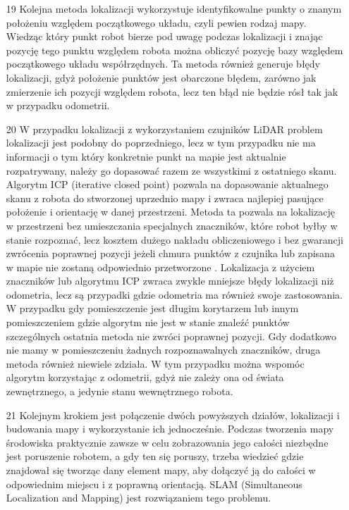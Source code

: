 \documentclass[10pt,a4paper]{article}
\begin{document}
\begin{itemize}
		\item[19]
		Kolejna metoda lokalizacji wykorzystuje identyfikowalne punkty o znanym położeniu względem początkowego układu, czyli pewien rodzaj mapy.
Wiedząc który punkt robot bierze pod uwagę podczas lokalizacji i znając pozycję tego punktu względem robota można obliczyć pozycję bazy względem początkowego układu współrzędnych.
Ta metoda również generuje błędy lokalizacji, gdyż położenie punktów jest obarczone błędem, zarówno jak zmierzenie ich pozycji względem robota, lecz ten błąd nie będzie rósł tak jak w przypadku odometrii.
		\item[20]
	W przypadku lokalizacji z wykorzystaniem czujników LiDAR problem lokalizacji jest podobny do poprzedniego, lecz w tym przypadku nie ma informacji o tym który konkretnie punkt na mapie jest aktualnie rozpatrywany, należy go dopasować razem ze wszystkimi z ostatniego skanu.
Algorytm ICP (iterative closed point) pozwala na dopasowanie aktualnego skanu z robota do stworzonej uprzednio mapy i zwraca najlepiej pasujące położenie i orientację w danej przestrzeni.
Metoda ta pozwala na lokalizację w przestrzeni bez umieszczania specjalnych znaczników, które robot byłby w stanie rozpoznać, lecz kosztem dużego nakładu obliczeniowego i bez gwarancji zwrócenia poprawnej pozycji jeżeli chmura punktów z czujnika lub zapisana w mapie nie zostaną odpowiednio przetworzone \cite{icp_article}.
Lokalizacja z użyciem znaczników lub algorytmu ICP zwraca zwykle mniejsze błędy lokalizacji niż odometria, lecz są przypadki gdzie odometria ma również swoje zastosowania. 
W przypadku gdy pomieszczenie jest długim korytarzem lub innym pomieszczeniem gdzie algorytm nie jest w stanie znaleźć punktów szczególnych ostatnia metoda nie zwróci poprawnej pozycji.
Gdy dodatkowo nie mamy w pomieszczeniu żadnych rozpoznawalnych znaczników, druga metoda również niewiele zdziała.
W tym przypadku można wspomóc algorytm korzystając z odometrii, gdyż nie zależy ona od świata zewnętrznego, a jedynie stanu wewnętrznego robota.
		\item[21]
		Kolejnym krokiem jest połączenie dwóch powyższych działów, lokalizacji i budowania mapy i wykorzystanie ich jednocześnie. 
Podczas tworzenia mapy środowiska praktycznie zawsze w celu zobrazowania jego całości niezbędne jest poruszenie robotem, a gdy ten się poruszy, trzeba wiedzieć gdzie znajdował się tworząc dany element mapy, aby dołączyć ją do całości w odpowiednim miejscu i z poprawną orientacją.
SLAM (Simultaneous Localization and Mapping) jest rozwiązaniem tego problemu.

\end{itemize}
\end{document}
